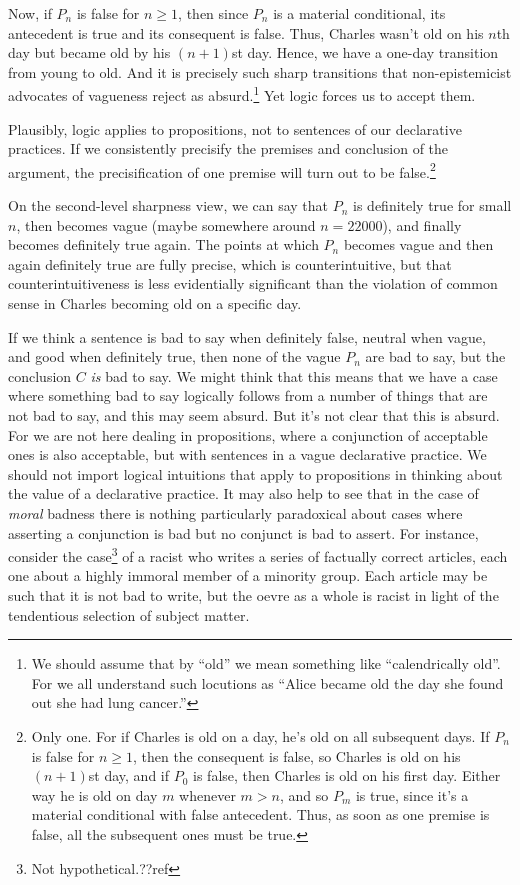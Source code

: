 Now, if $P_n$ is false for $n\ge 1$, then since $P_n$ is a material conditional, its 
antecedent is true and its consequent is false. Thus, Charles wasn't old on his $n$th
day but became old by his $(n+1)$st day. Hence, we have a one-day transition from 
young to old. And it is precisely such sharp transitions that non-epistemicist advocates
of vagueness reject as absurd.\footnote{We should assume that by ``old'' we mean something like
``calendrically old''. For we all understand such locutions as ``Alice became old the
day she found out she had lung cancer.''} Yet logic forces us to accept them.

Plausibly, logic applies to propositions, not to 
sentences of our declarative practices. If we consistently precisify the premises and conclusion
of the argument, the precisification of one premise will turn out to be false.\footnote{Only one. For if Charles is old
on a day, he's old on all subsequent days. If $P_n$ is false for $n\ge 1$, then the consequent
is false, so Charles is old on his $(n+1)$st day, and if $P_0$ is false, then Charles is old on
his first day. Either way he is old on day $m$ whenever $m>n$, and
so $P_m$ is true, since it's a material conditional with false antecedent. Thus, as soon as one
premise is false, all the subsequent ones must be true.} 

On the second-level sharpness view, we can say that $P_n$ is definitely true for small $n$,
then becomes vague (maybe somewhere around $n=22000$), and finally becomes definitely true again. 
The points at which $P_n$ becomes vague and then again definitely true are fully precise, which is 
counterintuitive, but that counterintuitiveness is less evidentially significant than the 
violation of common sense in Charles becoming old on a specific day.

If we think a sentence is bad to say when definitely false, neutral when vague, and good when
definitely true, then none of the vague $P_n$ are bad to say, but the conclusion $C$ \textit{is} bad
to say. We might think that this means that we have a case where something bad to say logically
follows from a number of things that are not bad to say, and this may seem absurd. But
it's not clear that this is absurd. For we are not here dealing in propositions, where a conjunction
of acceptable ones is also acceptable, but with sentences in a vague declarative practice. We should
not import logical intuitions that apply to propositions in thinking about the value of a declarative
practice. It may also help to see that in the case of \textit{moral} badness there is nothing particularly
paradoxical about cases where asserting a conjunction is bad but no conjunct is bad to assert. For instance,
consider the case\footnote{Not hypothetical.??ref} of a racist who writes a series of 
factually correct articles, each one about a highly immoral member of a minority group. Each
article may be such that it is not bad to write, but the oevre as a whole is racist in light of 
the tendentious selection of subject matter.	

